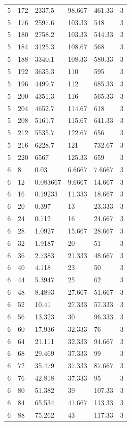 \begin{tabular}{|p{0.6cm}|p{0.5cm}|p{1.15cm}|p{1cm}|p{1cm}|p{0.7cm}|}
5 & 172 & 2337.5 & 98.667 & 461.33 & 3 \\
5 & 176 & 2597.6 & 103.33 & 548 & 3 \\
5 & 180 & 2758.2 & 103.33 & 544.33 & 3 \\
5 & 184 & 3125.3 & 108.67 & 568 & 3 \\
5 & 188 & 3340.1 & 108.33 & 580.33 & 3 \\
5 & 192 & 3635.3 & 110 & 595 & 3 \\
5 & 196 & 4499.7 & 112 & 685.33 & 3 \\
5 & 200 & 4351.3 & 116 & 565.33 & 3 \\
5 & 204 & 4652.7 & 114.67 & 618 & 3 \\
5 & 208 & 5161.7 & 115.67 & 641.33 & 3 \\
5 & 212 & 5535.7 & 122.67 & 656 & 3 \\
5 & 216 & 6228.7 & 121 & 732.67 & 3 \\
5 & 220 & 6567 & 125.33 & 659 & 3 \\
6 & 8 & 0.03 & 6.6667 & 7.6667 & 3 \\
6 & 12 & 0.083667 & 9.6667 & 14.667 & 3 \\
6 & 16 & 0.19233 & 11.333 & 18.667 & 3 \\
6 & 20 & 0.397 & 13 & 23.333 & 3 \\
6 & 24 & 0.712 & 16 & 24.667 & 3 \\
6 & 28 & 1.0927 & 15.667 & 28.667 & 3 \\
6 & 32 & 1.9187 & 20 & 51 & 3 \\
6 & 36 & 2.7383 & 21.333 & 48.667 & 3 \\
6 & 40 & 4.118 & 23 & 50 & 3 \\
6 & 44 & 5.3947 & 25 & 62 & 3 \\
6 & 48 & 8.4893 & 27.667 & 51.667 & 3 \\
6 & 52 & 10.41 & 27.333 & 57.333 & 3 \\
6 & 56 & 13.323 & 30 & 96.333 & 3 \\
6 & 60 & 17.936 & 32.333 & 76 & 3 \\
6 & 64 & 21.111 & 32.333 & 94.667 & 3 \\
6 & 68 & 29.469 & 37.333 & 99 & 3 \\
6 & 72 & 35.479 & 37.333 & 87.667 & 3 \\
6 & 76 & 42.818 & 37.333 & 95 & 3 \\
6 & 80 & 51.382 & 39 & 107.33 & 3 \\
6 & 84 & 65.534 & 41.667 & 113.33 & 3 \\
6 & 88 & 75.262 & 43 & 117.33 & 3 \\

\end{tabular}
